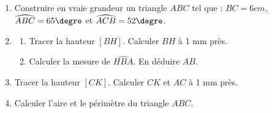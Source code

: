 \begin{exercice}
\begin{enumerate}
\item Construire en vraie grandeur un triangle $ABC$ tel que : $BC=6 cm$, $\widehat{ABC}=65\textrm{\degre}$ et $\widehat{ACB}=52\textrm{\degre}$.
\item 
\begin{enumerate}
\item Tracer la hauteur $[BH]$. Calculer $BH$ à 1 mm près.
\item Calculer la mesure de $\widehat{HBA}$. En déduire $AB$.
\end{enumerate}
\item Tracer la hauteur $[CK]$. Calculer $CK$ et $AC$ à 1 mm près.
\item Calculer l'aire et le périmètre du triangle $ABC$.
\end{enumerate}
\end{exercice}